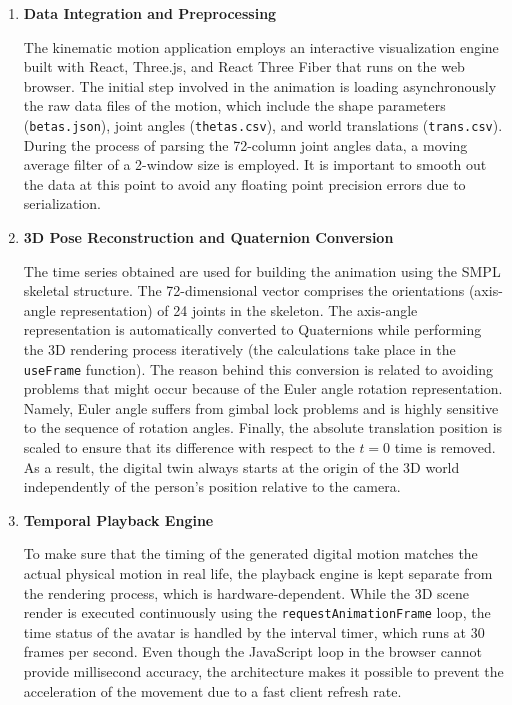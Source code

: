 \documentclass[12pt, a4paper, oneside]{report}
\begin{document}
\begin{enumerate}

    \item \textbf{Data Integration and Preprocessing}

    The kinematic motion application employs an interactive visualization engine built with React, Three.js, and React Three Fiber that runs on the web browser. The initial step involved in the animation is loading asynchronously the raw data files of the motion, which include the shape parameters (\texttt{betas.json}), joint angles (\texttt{thetas.csv}), and world translations (\texttt{trans.csv}). During the process of parsing the 72-column joint angles data, a moving average filter of a 2-window size is employed. It is important to smooth out the data at this point to avoid any floating point precision errors due to serialization.

    \item \textbf{3D Pose Reconstruction and Quaternion Conversion}

    The time series obtained are used for building the animation using the SMPL skeletal structure. The 72-dimensional vector comprises the orientations (axis-angle representation) of 24 joints in the skeleton. The axis-angle representation is automatically converted to Quaternions while performing the 3D rendering process iteratively (the calculations take place in the \texttt{useFrame} function). The reason behind this conversion is related to avoiding problems that might occur because of the Euler angle rotation representation. Namely, Euler angle suffers from gimbal lock problems and is highly sensitive to the sequence of rotation angles. Finally, the absolute translation position is scaled to ensure that its difference with respect to the $t = 0$ time is removed. As a result, the digital twin always starts at the origin of the 3D world independently of the person's position relative to the camera.

    \item \textbf{Temporal Playback Engine}

    To make sure that the timing of the generated digital motion matches the actual physical motion in real life, the playback engine is kept separate from the rendering process, which is hardware-dependent. While the 3D scene render is executed continuously using the \texttt{requestAnimationFrame} loop, the time status of the avatar is handled by the interval timer, which runs at 30 frames per second. Even though the JavaScript loop in the browser cannot provide millisecond accuracy, the architecture makes it possible to prevent the acceleration of the movement due to a fast client refresh rate.

\end{enumerate}
\end{document}
